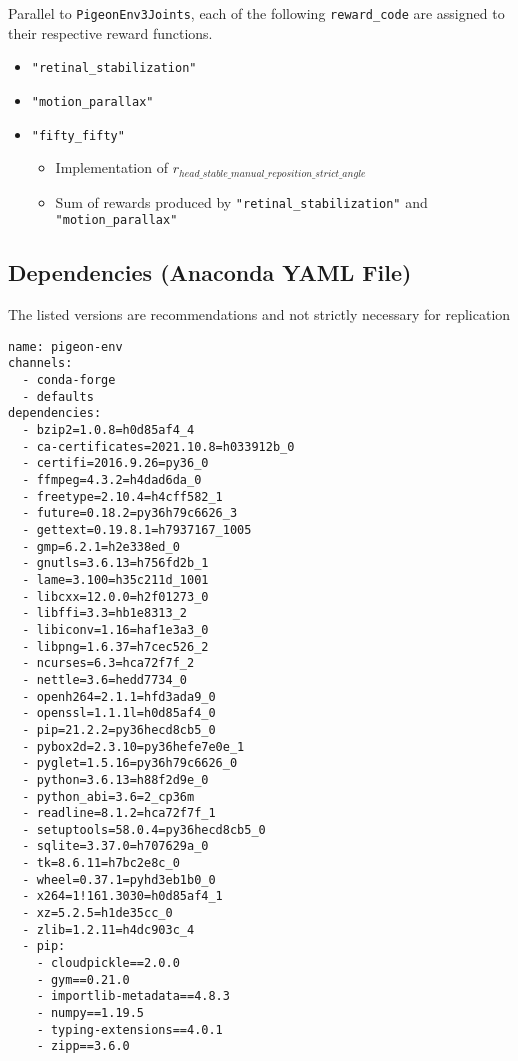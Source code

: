 Parallel to \lstinline|PigeonEnv3Joints|, each of the following \lstinline|reward_code| are assigned to their respective reward functions.
\begin{itemize}
  \item \lstinline|"retinal_stabilization"|
  \item \lstinline|"motion_parallax"|
  \item \lstinline|"fifty_fifty"|
      \begin{itemize}
          \item Implementation of $r_{head\_stable\_manual\_reposition\_strict\_angle}$
          \item Sum of rewards produced by  \lstinline|"retinal_stabilization"| and \lstinline|"motion_parallax"|
      \end{itemize}
\end{itemize}

\subsection{Dependencies (Anaconda YAML File)}
The listed versions are recommendations and not strictly necessary for replication
\begin{lstlisting}
name: pigeon-env
channels:
  - conda-forge
  - defaults
dependencies:
  - bzip2=1.0.8=h0d85af4_4
  - ca-certificates=2021.10.8=h033912b_0
  - certifi=2016.9.26=py36_0
  - ffmpeg=4.3.2=h4dad6da_0
  - freetype=2.10.4=h4cff582_1
  - future=0.18.2=py36h79c6626_3
  - gettext=0.19.8.1=h7937167_1005
  - gmp=6.2.1=h2e338ed_0
  - gnutls=3.6.13=h756fd2b_1
  - lame=3.100=h35c211d_1001
  - libcxx=12.0.0=h2f01273_0
  - libffi=3.3=hb1e8313_2
  - libiconv=1.16=haf1e3a3_0
  - libpng=1.6.37=h7cec526_2
  - ncurses=6.3=hca72f7f_2
  - nettle=3.6=hedd7734_0
  - openh264=2.1.1=hfd3ada9_0
  - openssl=1.1.1l=h0d85af4_0
  - pip=21.2.2=py36hecd8cb5_0
  - pybox2d=2.3.10=py36hefe7e0e_1
  - pyglet=1.5.16=py36h79c6626_0
  - python=3.6.13=h88f2d9e_0
  - python_abi=3.6=2_cp36m
  - readline=8.1.2=hca72f7f_1
  - setuptools=58.0.4=py36hecd8cb5_0
  - sqlite=3.37.0=h707629a_0
  - tk=8.6.11=h7bc2e8c_0
  - wheel=0.37.1=pyhd3eb1b0_0
  - x264=1!161.3030=h0d85af4_1
  - xz=5.2.5=h1de35cc_0
  - zlib=1.2.11=h4dc903c_4
  - pip:
    - cloudpickle==2.0.0
    - gym==0.21.0
    - importlib-metadata==4.8.3
    - numpy==1.19.5
    - typing-extensions==4.0.1
    - zipp==3.6.0
\end{lstlisting}

